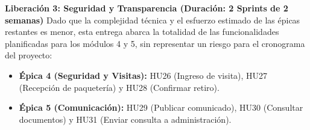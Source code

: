 \textbf{Liberación 3: Seguridad y Transparencia (Duración: 2 Sprints de 2 semanas)}
Dado que la complejidad técnica y el esfuerzo estimado de las épicas restantes es menor, esta entrega abarca la totalidad de las funcionalidades planificadas para los módulos 4 y 5, sin representar un riesgo para el cronograma del proyecto:
\begin{itemize}
    \item \textbf{Épica 4 (Seguridad y Visitas):} HU26 (Ingreso de visita), HU27 (Recepción de paquetería) y HU28 (Confirmar retiro).  
    \item \textbf{Épica 5 (Comunicación):} HU29 (Publicar comunicado), HU30 (Consultar documentos) y HU31 (Enviar consulta a administración).
\end{itemize}
